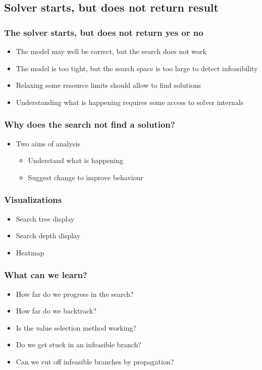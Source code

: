 \subsection{Solver starts, but does not return result}

\begin{frame}
\frametitle{The solver starts, but does not return yes or no}
\begin{itemize}
\item The model may well be correct, but the search does not work
\item The model is too tight, but the search space is too large to detect infeasibility
\item Relaxing some resource limits should allow to find solutions
\item Understanding what is happening requires some access to solver internals
\end{itemize}
\end{frame}

\begin{frame}
\frametitle{Why does the search not find a solution?}
\begin{itemize}
\item Two aims of analysis
\begin{itemize}
\item Understand what is happening
\item Suggest change to improve behaviour
\end{itemize}
\end{itemize}
\end{frame}


\begin{frame}
  \frametitle{Visualizations}
  \begin{itemize}
  \item Search tree display
  \item Search depth display
  \item Heatmap
  \end{itemize}
\end{frame}

\begin{frame}
  \frametitle{What can we learn?}
    \begin{itemize}
    \item How far do we progress in the search?
    \item How far do we backtrack?
    \item Is the value selection method working?
    \item Do we get stuck in an infeasible branch?
      \item Can we cut off infeasible branches by propagation?
    \end{itemize}
\end{frame}

